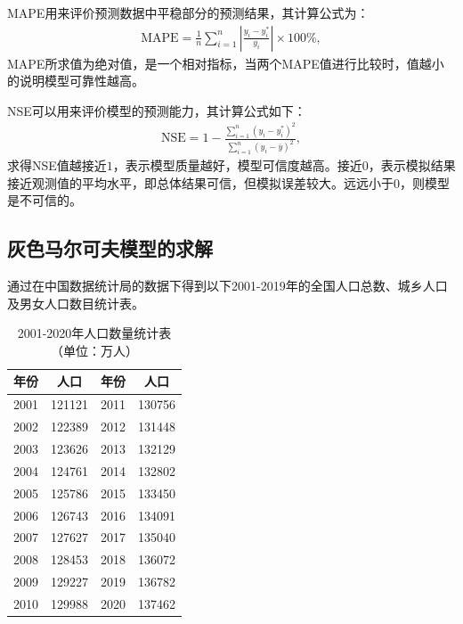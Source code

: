 \documentclass{whutmod}
\begin{document}
		MAPE用来评价预测数据中平稳部分的预测结果，其计算公式为：
		\begin{gather*}
		\mathrm{MAPE}=\frac{1}{n} \sum_{i=1}^{n}\left|\frac{y_{i}-y_{i}^{*}}{y_{i}}\right| \times 100 \% ,
		\end{gather*}
		MAPE所求值为绝对值，是一个相对指标，当两个MAPE值进行比较时，值越小的说明模型可靠性越高。
		
		NSE可以用来评价模型的预测能力，其计算公式如下：
		\begin{gather*}
		\mathrm{NSE}=1-\frac{\sum_{i=1}^{n}\left(y_{i}-y_{i}^{*}\right)^{2}}{\sum_{i=1}^{n}\left(y_{i}-\overline{y}\right)^{2}}       ,
		\end{gather*}
		求得NSE值越接近$1$，表示模型质量越好，模型可信度越高。接近$0$，表示模拟结果接近观测值的平均水平，即总体结果可信，但模拟误差较大。远远小于$0$，则模型是不可信的。

		
		\subsection{灰色马尔可夫模型的求解}
		通过在中国数据统计局的数据下得到以下2001-2019年的全国人口总数、城乡人口及男女人口数目统计表。
		\begin{table}[H]
			\centering		
			\caption{2001-2020年人口数量统计表（单位：万人）}\label{biadao1}
			\begin{tabular}{cccc}
				\toprule[2pt]
				\multicolumn{1}{m{2cm}}{\centering 年份}
				& \multicolumn{1}{m{3cm}}{\centering 人口}
				&\multicolumn{1}{m{2cm}}{\centering 年份}
				& \multicolumn{1}{m{3cm}}{\centering 人口}
				\\
				\midrule[1pt]
				2001 & 	121121&2011 &130756 \\ 
			2002	& 122389 & 2012 &131448  \\
				2003&  123626&  2013& 132129 \\
				2004& 124761 & 2014 &132802  \\
			2005	&125786  & 2015 & 133450 \\
			2006&126743  & 2016 &134091  \\
			2007& 127627 & 2017 &135040  \\
			2008&128453  & 2018 & 136072 \\
			2009&  129227&  2019& 136782 \\
		2010 & 	129988&2020 &137462 \\ 
				\bottomrule[2pt]	
			\end{tabular}
		\end{table}
		
\end{document}
